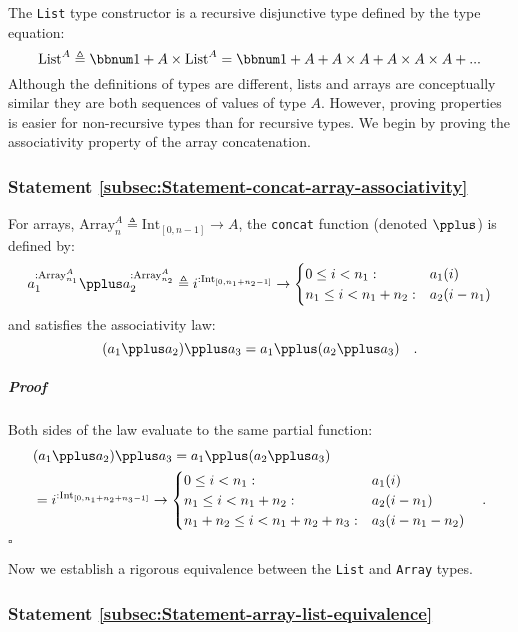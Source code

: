 The \lstinline!List! type constructor is a recursive disjunctive
type defined by the type equation:
\[
\text{List}^{A}\triangleq\bbnum 1+A\times\text{List}^{A}=\bbnum 1+A+A\times A+A\times A\times A+...
\]
Although the definitions of types are different, lists and arrays
are conceptually similar \textemdash{} they are both sequences of
values of type $A$. However, proving properties is easier for non-recursive
types than for recursive types. We begin by proving the associativity
property of the array concatenation. 

\subsubsection{Statement \label{subsec:Statement-concat-array-associativity}\ref{subsec:Statement-concat-array-associativity}}

For arrays, $\text{Array}_{n}^{A}\triangleq\text{Int}_{[0,n-1]}\rightarrow A$,
the \lstinline!concat! function (denoted $\pplus$) is defined by:
\[
a_{1}^{:\text{Array}_{n_{1}}^{A}}\pplus a_{2}^{:\text{Array}_{n_{2}}^{A}}\triangleq i^{:\text{Int}_{[0,n_{1}+n_{2}-1]}}\rightarrow\begin{cases}
0\leq i<n_{1}: & a_{1}(i)\\
n_{1}\leq i<n_{1}+n_{2}: & a_{2}(i-n_{1})
\end{cases}
\]
and satisfies the associativity law:
\[
(a_{1}\pplus a_{2})\pplus a_{3}=a_{1}\pplus(a_{2}\pplus a_{3})\quad.
\]


\subparagraph{Proof}

Both sides of the law evaluate to the same partial function:
\begin{align*}
 & (a_{1}\pplus a_{2})\pplus a_{3}=a_{1}\pplus(a_{2}\pplus a_{3})\\
 & =i^{:\text{Int}_{[0,n_{1}+n_{2}+n_{3}-1]}}\rightarrow\begin{cases}
0\leq i<n_{1}: & a_{1}(i)\\
n_{1}\leq i<n_{1}+n_{2}: & a_{2}(i-n_{1})\\
n_{1}+n_{2}\leq i<n_{1}+n_{2}+n_{3}: & a_{3}(i-n_{1}-n_{2})
\end{cases}\quad.
\end{align*}
$\square$

Now we establish a rigorous equivalence between the \lstinline!List!
and \lstinline!Array! types.

\subsubsection{Statement \label{subsec:Statement-array-list-equivalence}\ref{subsec:Statement-array-list-equivalence}}

